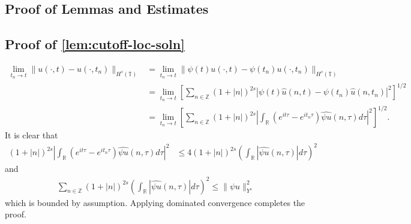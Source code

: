 \documentclass[12pt,reqno]{amsart}
\numberwithin{equation}{section}  %
\numberwithin{figure}{section}
\newcommand{\rr}{\mathbb{R}}
\newcommand{\zz}{\mathbb{Z}}
\newcommand{\ci}{\mathbb{T}}
\newcommand{\wh}{\widehat}
\theoremstyle{plain}
\theoremstyle{definition}
\theoremstyle{remark}
\begin{document}
%
\begin{appendices}
\section{Proof of Lemmas and Estimates}
\subsection{Proof of \cref{lem:cutoff-loc-soln}}
%
%
\begin{equation*}
  \begin{split}
    \lim_{t_{n} \to t} \|u(\cdot, t) - u(\cdot, t_{n})\|_{H^s(\ci)} 
    & = \lim_{t_{n} \to t} \|\psi(t) u(\cdot, t) - \psi(t_n) u(\cdot, t_{n})\|_{H^s(\ci)} 
    \\
    & = \lim_{t_n \to t} \left[ \sum_{n \in \zz}\left( 1 + | n |
    \right)^{2s} | \psi(t)  \wh{u}(n, t) - \psi(t_n) \wh{ u}(n, t_n) |^2 \right]^{1/2}
    \\
    & = \lim_{t_n \to t} \left[ \sum_{n \in \zz} \left( 1 + | n |
    \right)^{2s} | \int_{\rr} (e^{it \tau} - e^{it_{n} \tau}) \wh{\psi u}(n,
    \tau) d \tau |^2 \right]^{1/2}.
  \end{split}
\end{equation*}
    It is clear that
    \begin{equation*}
      \begin{split}
        \left( 1 + | n |
        \right)^{2s} | \int_{\rr} (e^{it \tau} - e^{it_{n}\tau}) \wh{\psi u}(n, \tau) d \tau |^2 
    & \le 4  \left( 1 + | n |
    \right)^{2s} \left ( \int_{\rr} |\wh{\psi u}(n, \tau)| d \tau
    \right )^2 
  \end{split}
\end{equation*}
and 
%
%
\begin{equation*}
  \begin{split}
 \sum_{n \in \zz} \left( 1 + | n |
    \right)^{2s} \left ( \int_{\rr} |\wh{\psi u}(n, \tau)| d \tau
    \right ) ^2 
    \le \|\psi u \|_{Y^s}^2 
  \end{split}
\end{equation*}
which is bounded by assumption.
Applying dominated convergence completes the proof. \qquad \qedsymbol
%
%

\end{appendices}
\end{document}
